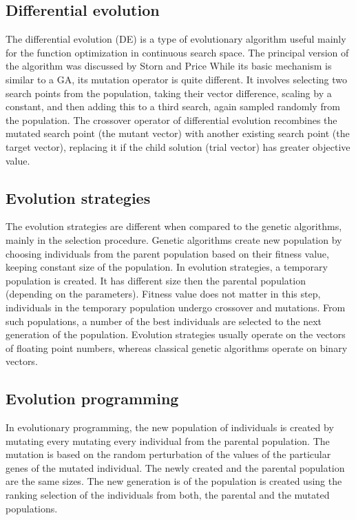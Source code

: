 \documentclass[twoside]{ctuthesis}
\theoremstyle{plain}
\theoremstyle{definition}
\theoremstyle{note}
\begin{document}
\subsection{Differential evolution}
The differential evolution (DE) is a type of evolutionary algorithm useful mainly for the function optimization in continuous search space. The principal version of the algorithm was discussed by Storn and Price \cite{storn1997differential} While its basic mechanism is similar to a GA, its mutation operator is quite different. It involves selecting two search points from the population, taking their vector difference, scaling by a constant, and then adding this to a third search, again sampled randomly from the population. The crossover operator of differential evolution recombines the mutated search point (the mutant vector) with another existing search point (the target vector), replacing it if the child solution (trial vector) has greater objective value.

\subsection{Evolution strategies}
The evolution strategies are different when compared to the genetic algorithms, mainly in the selection procedure. Genetic algorithms create new population by choosing individuals from the parent population based on their fitness value, keeping constant size of the population. In evolution strategies, a temporary population is created. It has different size then the parental population (depending on the parameters). Fitness value does not matter in this step, individuals in the temporary population undergo crossover and mutations. From such populations, a number of the best individuals are selected to the next generation of the population. Evolution strategies usually operate on the vectors of floating point numbers, whereas classical genetic algorithms operate on binary vectors.

\subsection{Evolution programming}
In evolutionary programming, the new population of individuals is created by mutating every mutating every individual from the parental population. The mutation is based on the random perturbation of the values of the particular genes of the mutated individual. The newly created and the parental population are the same sizes. The new generation is of the population is created using the ranking selection of the individuals from both, the parental and the mutated populations.
\end{document}
